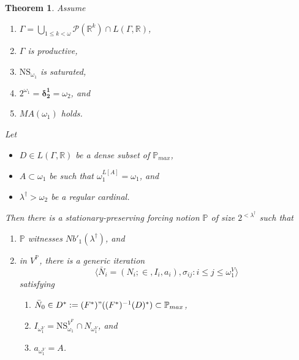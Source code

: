 \documentclass[12pt, twoside]{memoir}
\numberwithin{equation}{section}
\newtheorem{thm}{Theorem}[section]
\theoremstyle{definition}
\theoremstyle{remark}
\theoremstyle{definition}
\theoremstyle{definition}
\theoremstyle{definition}
\theoremstyle{remark}
\begin{document}
\begin{thm}\label{notion2}
Assume
\begin{enumerate}[label=(\roman*), leftmargin=40pt]
    \item\label{h1} $\Gamma  = \bigcup_{1 \leq k < \omega} \mathcal{P}(\mathbb{R}^{k}) \cap L(\Gamma, \mathbb{R})$,
    \item\label{h2} $\Gamma$ is productive,
    \item\label{h3} $\mathrm{NS}_{\omega_1}$ is saturated,
    \item\label{h4} $2^{\omega_1} = \mathbf{\delta^1_2} = \omega_2$, and
    \item\label{h5} $MA(\omega_1)$ holds.
\end{enumerate}
Let 
\begin{itemize}
    \item $D \in L(\Gamma, \mathbb{R})$ be a dense subset of $\mathbb{P}_{max}$,
    \item $A \subset \omega_1$ be such that $\omega_1^{L[A]} = \omega_1$, and
    \item $\lambda^{\dagger} > \omega_2$ be a regular cardinal.
\end{itemize}
Then there is a stationary-preserving forcing notion $\mathbb{P}$ of size $2^{< \lambda^{\dagger}}$ such that 
\begin{enumerate}[label=(\alph*)]
    \item $\mathbb{P}$ witnesses $Nb'_1(\lambda^{\dagger})$, and
    \item in $V^{\mathbb{P}}$, there is a generic iteration $$\langle \bar{N}_i = (N_i; \in, I_i, a_i), \sigma_{ij} : i \leq j \leq \omega_1^V \rangle$$ satisfying 
    \begin{enumerate}[label=(\arabic*), leftmargin=40pt]
        \item\label{nov1} $\bar{N}_0 \in D^* := (F^*) " ((F^*)^{-1}(D)^*) \subset \mathbb{P}_{max}$,
        \item\label{nov2} $I_{\omega_1^V} = \mathrm{NS}_{\omega_1}^{V^{\mathbb{P}}} \cap N_{\omega_1^V}$, and
        \item\label{nov3} $a_{\omega_1^V} = A$.
    \end{enumerate}
\end{enumerate}
\end{thm}
\end{document}
